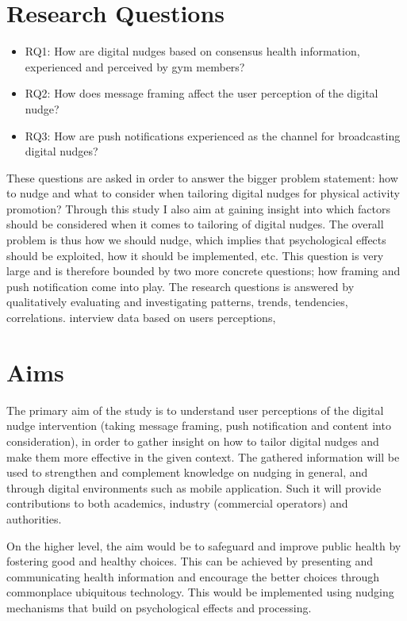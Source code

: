 \section{Research Questions}
\begin{itemize}
\item RQ1: How are digital nudges based on consensus health information, experienced and perceived by gym members? 
\item RQ2: How does message framing affect the user perception of the digital nudge?
\item RQ3: How are push notifications experienced as the channel for broadcasting digital nudges? 
\end{itemize}

These questions are asked in order to answer the bigger problem statement: how to nudge and what to consider when tailoring digital nudges for physical activity promotion? Through this study I also aim at gaining insight into which factors should be considered when it comes to tailoring of digital nudges. The overall problem is thus how we should nudge, which implies that psychological effects should be exploited, how it should be implemented, etc. This question is very large and is therefore bounded by two more concrete questions; how framing and push notification come into play. The research questions is answered by qualitatively evaluating and investigating patterns, trends, tendencies, correlations. interview data based on users perceptions,  

\section{Aims}
The primary aim of the study is to understand user perceptions of the digital nudge intervention (taking message framing, push notification and content into consideration), in order to gather insight on how to tailor digital nudges and make them more effective in the given context. The gathered information will be used to strengthen and complement knowledge on nudging in general, and through digital environments such as mobile application. Such it will provide contributions to both academics, industry (commercial operators) and authorities. 

On the higher level, the aim would be to safeguard and improve public health by fostering good and healthy choices. This can be achieved by presenting and communicating health information and encourage the better choices through commonplace ubiquitous technology. This would be implemented using nudging mechanisms that build on psychological effects and processing. 

